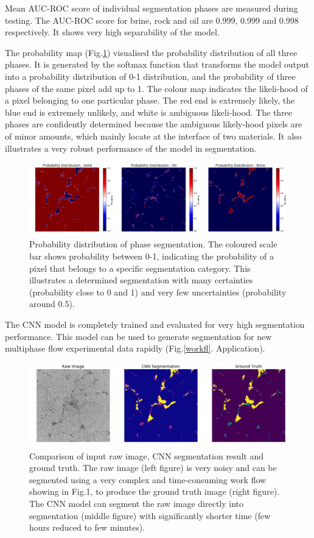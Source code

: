 \documentclass[draft,linenumbers]{agujournal2018}
\begin{document}
Mean AUC-ROC score of individual segmentation phases are measured during testing. The AUC-ROC score for brine, rock and oil are 0.999, 0.999 and 0.998 respectively. It shows very high separability of the model.

The probability map (Fig.\ref{prob}) visualised the probability distribution of all three phases. It is generated by the softmax function that transforms the model output into a probability distribution of 0-1 distribution, and the probability of three phases of the same pixel add up to 1.  The colour map indicates the likeli-hood of a pixel belonging to one particular phase. The red end is extremely likely, the blue end is extremely unlikely, and white is ambiguous likeli-hood. The three phases are confidently determined because the ambiguous likely-hood pixels are of minor amounts, which mainly locate at the interface of two materials. It also illustrates a very robust performance of the model in segmentation. 

\begin{figure}[h]
 \centering
 \includegraphics[width=33pc]{imgs/17_test_probmap.png}
 \caption{Probability distribution of phase segmentation. The coloured scale bar shows probability between 0-1, indicating the probability of a pixel that belongs to a specific segmentation category. This illustrates a determined segmentation with many certainties (probability close to 0 and 1) and very few uncertainties (probability around 0.5).}
 \label{prob}
 \end{figure}
 
The CNN model is completely trained and evaluated for very high segmentation performance. This model can be used to generate segmentation for new multiphase flow experimental data rapidly (Fig.\ref{workfl}. Application).

\begin{figure}[h]
 \centering
 \includegraphics[width=33pc]{imgs/17_test_result.png}
 \caption{Comparison of input raw image, CNN segmentation result and ground truth. The raw image (left figure) is very noisy and can be segmented using a very complex and time-consuming work flow showing in Fig.1, to produce the ground truth image (right figure). The CNN model can segment the raw image directly into segmentation (middle figure) with significantly shorter time (few hours reduced to few minutes).}
 \label{result}
 \end{figure}
\end{document}
